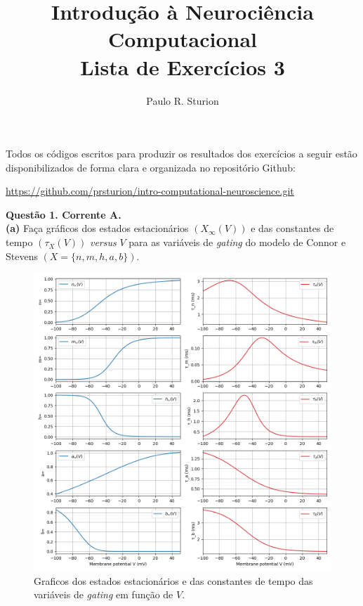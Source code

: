 \documentclass[english,11pt,a4paper]{article}
\title{Introdução à Neurociência Computacional\\Lista de Exercícios 3}
\author{Paulo R. Sturion}
\begin{document}
	\maketitle
	
	\noindent Todos os códigos escritos para produzir os resultados dos exercícios a seguir estão disponibilizados de forma clara e organizada no repositório Github:
	
	\begin{center}
		\noindent \href{https://github.com/prsturion/intro-computational-neurosciene.git}{https://github.com/prsturion/intro-computational-neuroscience.git} \newline
	\end{center}
	
	\noindent\textbf{Questão 1. Corrente A.}\\
	
	\noindent \textbf{(a)} Faça gráficos dos estados estacionários $(X_{\infty}(V))$ e das constantes de tempo $(\tau_{X}(V))$ \textit{versus} $V$ para as variáveis de \textit{gating} do modelo de Connor e Stevens $(X = \{n, m, h, a, b\})$.
	
	\begin{figure}[H]
		\centering
		\includegraphics[width=13cm]{../figures/ex_1a.png}
		\caption{Graficos dos estados estacionários e das constantes de tempo das variáveis de \textit{gating} em função de $V$.}
	\end{figure}
	
\end{document}
